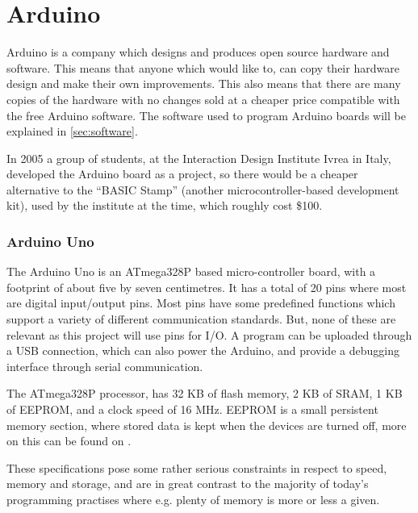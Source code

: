 
\section{Arduino}\label{sec:arduino}
Arduino is a company which designs and produces open source hardware and software.
This means that anyone which would like to, can copy their hardware design and make their own improvements.
This also means that there are many copies of the hardware with no changes sold at a cheaper price compatible with the free Arduino software.
The software used to program Arduino boards will be explained in \ref{sec:software}.

\begin{tcolorbox}[floatplacement=b,float,colback=white!5,colframe=aaublue!50,title=The Birth of the Arduino \cite{birthofarduino}.]
In 2005 a group of students, at the Interaction Design Institute Ivrea in Italy, developed the Arduino board as a project, so there would be a cheaper alternative to the ``BASIC Stamp'' (another microcontroller-based development kit), used by the institute at the time, which roughly cost \$100.
\end{tcolorbox}

\subsubsection{Arduino Uno}
The Arduino Uno is an ATmega328P based micro-controller board, with a footprint of about five by seven centimetres.
It has a total of 20 pins where most are digital input/output pins.
Most pins have some predefined functions which support a variety of different communication standards. 
But, none of these are relevant as this project will use pins for I/O. 
A program can be uploaded through a USB connection, which can also power the Arduino, and provide a debugging interface through serial communication.

The ATmega328P processor, has 32 KB of flash memory, 2 KB of SRAM, 1 KB of EEPROM, and a clock speed of 16 MHz.
EEPROM is a small persistent memory section, where stored data is kept when the devices are turned off, more on this can be found on \cite{EEPROM}.

These specifications pose some rather serious constraints in respect to speed, memory and storage, and are in great contrast to the majority of today's programming practises where e.g. plenty of memory is more or less a given.